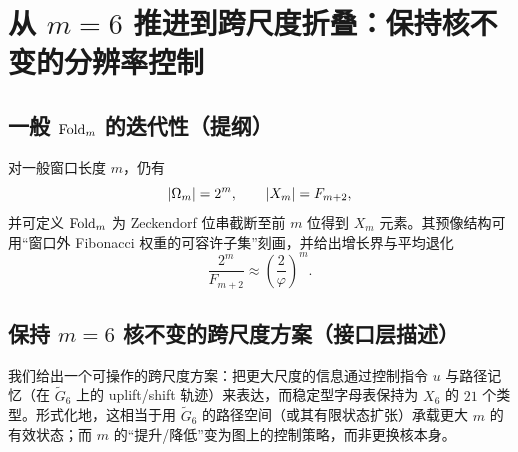 \section{从 $m=6$ 推进到跨尺度折叠：保持核不变的分辨率控制}\label{sec:multiscale}

\subsection{一般 $\mathrm{Fold}_m$ 的迭代性（提纲）}
对一般窗口长度 $m$，仍有
\[
  \left\lvert \Omega_m\right\rvert=2^m,\qquad \left\lvert X_m\right\rvert=F_{m+2},
\]
并可定义 $\mathrm{Fold}_m$ 为 Zeckendorf 位串截断至前 $m$ 位得到 $X_m$ 元素。其预像结构可用“窗口外 Fibonacci 权重的可容许子集”刻画，并给出增长界与平均退化
\[
  \frac{2^m}{F_{m+2}}\approx \left(\frac{2}{\varphi}\right)^m.
\]

\subsection{保持 $m=6$ 核不变的跨尺度方案（接口层描述）}
我们给出一个可操作的跨尺度方案：把更大尺度的信息通过控制指令 $u$ 与路径记忆（在 $\widetilde G_6$ 上的 uplift/shift 轨迹）来表达，而稳定型字母表保持为 $X_6$ 的 $21$ 个类型。形式化地，这相当于用 $\widetilde G_6$ 的路径空间（或其有限状态扩张）承载更大 $m$ 的有效状态；而 $m$ 的“提升/降低”变为图上的控制策略，而非更换核本身。

